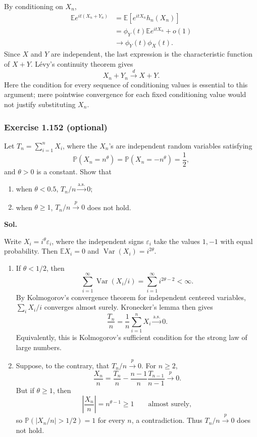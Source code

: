 \documentclass[lang=en,11pt,a4paper,citestyle=authoryear]{elegantpaper}
\newcommand{\E}{\mathbb{E}}
\renewcommand{\P}{\mathbb{P}}
\begin{document}
By conditioning on $X_n$,
\[
\begin{aligned}
\E e^{it(X_n+Y_n)}
&=\E[e^{itX_n}h_n(X_n)]\\
&=\phi_Y(t)\E e^{itX_n}+o(1)\\
&\longrightarrow\phi_Y(t)\phi_X(t).
\end{aligned}
\]
Since $X$ and $Y$ are independent, the last expression is the
characteristic function of $X+Y$. L\'evy's continuity theorem gives
\[
{X_n+Y_n\xrightarrow dX+Y.}
\]
Here the condition for every sequence of conditioning values is
essential to this argument; mere pointwise convergence for each
fixed conditioning value would not justify substituting $X_n$.
\vspace{2em}

\subsubsection*{Exercise 1.152 (optional)}
Let $T_n=\sum_{i=1}^nX_i$, where the $X_n$'s are independent random
variables satisfying
\[
\P(X_n=n^\theta)=\P(X_n=-n^\theta)=\frac12,
\]
and $\theta>0$ is a constant. Show that
\begin{enumerate}[label=(\alph*),leftmargin=*]
\item when $\theta<0.5$, $T_n/n\xrightarrow{\mathrm{a.s.}}0$;
\item when $\theta\ge1$, $T_n/n\xrightarrow{p}0$ does not hold.
\end{enumerate}

\par\vspace{0.5em}\noindent\textbf{Sol.}\par
Write $X_i=i^\theta\varepsilon_i$, where the independent signs
$\varepsilon_i$ take the values $1,-1$ with equal probability.
Then $\E X_i=0$ and $\operatorname{Var}(X_i)=i^{2\theta}$.
\begin{enumerate}[label=(\alph*),leftmargin=*]
\item If $\theta<1/2$, then
\[
\sum_{i=1}^\infty\operatorname{Var}(X_i/i)
=\sum_{i=1}^\infty i^{2\theta-2}<\infty.
\]
By Kolmogorov's convergence theorem for independent centered variables,
$\sum_iX_i/i$ converges almost surely. Kronecker's lemma then gives
\[
\boxed{\frac{T_n}{n}=\frac1n\sum_{i=1}^nX_i
\xrightarrow{\mathrm{a.s.}}0.}
\]
Equivalently, this is Kolmogorov's sufficient condition for the
strong law of large numbers.

\item Suppose, to the contrary, that $T_n/n\xrightarrow p0$.
For $n\ge2$,
\[
\frac{X_n}{n}
=\frac{T_n}{n}-\frac{n-1}{n}\frac{T_{n-1}}{n-1}
\xrightarrow p0.
\]
But if $\theta\ge1$, then
\[
\left|\frac{X_n}{n}\right|=n^{\theta-1}\ge1
\qquad\text{almost surely},
\]
so $\P(|X_n/n|>1/2)=1$ for every $n$, a contradiction.
Thus $T_n/n\xrightarrow p0$ does not hold.
\end{enumerate}
\vspace{2em}
\end{document}
